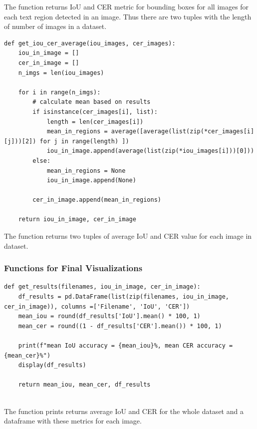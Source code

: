 The function  returns IoU and CER metric for bounding boxes for all images for each text region detected in an image. Thus there are two tuples with the length of number of images in a dataset.

\begin{lstlisting}[caption=get\_iou\_cer\_average]
def get_iou_cer_average(iou_images, cer_images):
    iou_in_image = []
    cer_in_image = []
    n_imgs = len(iou_images)
    
    for i in range(n_imgs):
        # calculate mean based on results 
        if isinstance(cer_images[i], list):
            length = len(cer_images[i])
            mean_in_regions = average([average(list(zip(*cer_images[i][j]))[2]) for j in range(length) ])
            iou_in_image.append(average(list(zip(*iou_images[i]))[0]))
        else:
            mean_in_regions = None
            iou_in_image.append(None)

        cer_in_image.append(mean_in_regions)
        
    return iou_in_image, cer_in_image
\end{lstlisting}
   
The function  returns two tuples of average IoU and CER value for each image in dataset.


\subsubsection*{Functions for Final Visualizations}

\begin{lstlisting}[caption=get\_results]
def get_results(filenames, iou_in_image, cer_in_image):
    df_results = pd.DataFrame(list(zip(filenames, iou_in_image, cer_in_image)), columns =['Filename', 'IoU', 'CER'])
    mean_iou = round(df_results['IoU'].mean() * 100, 1)
    mean_cer = round((1 - df_results['CER'].mean()) * 100, 1)
    
    print(f"mean IoU accuracy = {mean_iou}%, mean CER accuracy = {mean_cer}%")
    display(df_results)
    
    return mean_iou, mean_cer, df_results
    
\end{lstlisting}

The function  prints returns average IoU and CER for the whole dataset and a dataframe with these metrics for each image.


